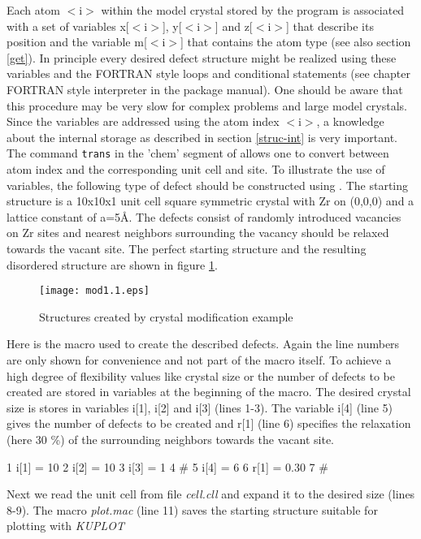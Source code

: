 Each atom $<$i$>$ within the model crystal stored by the program
\Discus is associated with a set of variables x[$<$i$>$],
y[$<$i$>$] and z[$<$i$>$] that describe its position and the variable
m[$<$i$>$] that contains the atom type (see also section \ref{get}). In
principle every desired defect structure might be realized using
these variables and the FORTRAN style loops and conditional
statements (see chapter FORTRAN style interpreter in the 
package manual). One should be aware that this
procedure may be very slow for complex problems and large model
crystals.  Since the variables are addressed using the atom index
$<$i$>$, a knowledge about the internal storage as described in
section \ref{struc-int} is very important.  The command {\tt trans}
in the 'chem' segment of \Discus allows one to convert between
atom index and the corresponding unit cell and site. To illustrate
the use of variables, the following type of defect should be
constructed using \discus. The starting structure is a 10x10x1
unit cell square symmetric crystal with Zr on (0,0,0) and a lattice
constant of a=5\AA. The defects consist of randomly introduced
vacancies on Zr sites and nearest neighbors surrounding the vacancy
should be relaxed towards the vacant site. The perfect starting
structure and the resulting disordered structure are shown in figure
\ref{mod1-fig1}.
%
\begin{figure}[htb]
   \centering
   \texttt{[image: mod1.1.eps]}
   \caption{Structures created by crystal modification example}
   \label{mod1-fig1}
\end{figure}
%
Here is the macro used to create the described defects.  Again the
line numbers are only shown for convenience and not part of the
macro itself. To achieve a high degree of flexibility values like
crystal size or the number of defects to be created are stored in
variables at the beginning of the macro.  The desired crystal size
is stores in variables i[1], i[2] and i[3] (lines 1-3).  The
variable i[4] (line 5) gives the number of defects to be created
and r[1] (line 6) specifies the relaxation (here 30 \%) of the
surrounding neighbors towards the vacant site.
%
\begin{MacVerbatim}
     1  i[1] = 10
     2  i[2] = 10
     3  i[3] = 1
     4  #
     5  i[4] = 6
     6  r[1] = 0.30
     7  #
\end{MacVerbatim}
%
Next we read the unit cell from file {\it cell.cll} and expand it to
the desired size (lines 8-9).  The macro {\it plot.mac} (line 11)
saves the starting structure suitable for plotting with {\it KUPLOT}
